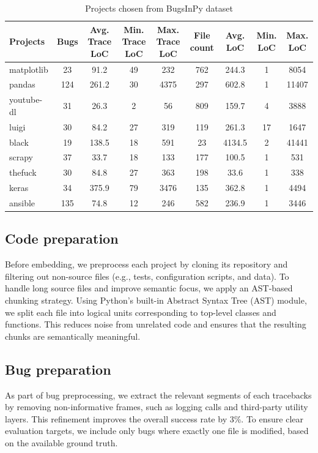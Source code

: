\begin{table}[H]
\centering
\begin{tabularx}{\textwidth}{lcccccccc}
\toprule
\textbf{Projects} & \textbf{Bugs} & \textbf{Avg. Trace LoC} & \textbf{Min. Trace LoC} & \textbf{Max. Trace LoC} & \textbf{File count} & \textbf{Avg. LoC} & \textbf{Min. LoC} & \textbf{Max. LoC} \\
\midrule
matplotlib & 23 & 91.2 & 49 & 232 & 762 & 244.3 & 1 & 8054 \\
pandas & 124 & 261.2 & 30 & 4375 & 297 & 602.8 & 1 & 11407 \\
youtube-dl & 31 & 26.3 & 2 & 56 & 809 & 159.7 & 4 & 3888 \\
luigi & 30 & 84.2 & 27 & 319 & 119 & 261.3 & 17 & 1647 \\
black & 19 & 138.5 & 18 & 591 & 23 & 4134.5 & 2 & 41441 \\
scrapy & 37 & 33.7 & 18 & 133 & 177 & 100.5 & 1 & 531 \\
thefuck & 30 & 84.8 & 27 & 363 & 198 & 33.6 & 1 & 338 \\
keras & 34 & 375.9 & 79 & 3476 & 135 & 362.8 & 1 & 4494 \\
ansible & 135 & 74.8 & 12 & 246 & 582 & 236.9 & 1 & 3446 \\
\bottomrule
\end{tabularx}
\caption{Projects chosen from BugsInPy dataset}
\label{tab:bugsinpy_projects}
\end{table}


\subsection{Code preparation}
Before embedding, we preprocess each project by cloning its repository and filtering out non-source files (e.g., tests, configuration scripts, and data). To handle long source files and improve semantic focus, we apply an AST-based chunking strategy. Using Python's built-in Abstract Syntax Tree (AST) module, we split each file into logical units corresponding to top-level classes and functions. This reduces noise from unrelated code and ensures that the resulting chunks are semantically meaningful.
\subsection{Bug preparation}
As part of bug preprocessing, we extract the relevant segments of each tracebacks by removing non-informative frames, such as logging calls and third-party utility layers. This refinement improves the overall success rate by 3\%. To ensure clear evaluation targets, we include only bugs where exactly one file is modified, based on the available ground truth.